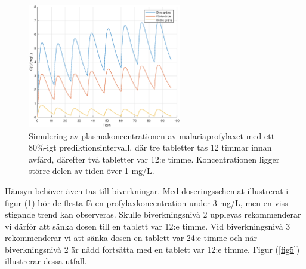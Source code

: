 \documentclass[a4paper,11pt]{article}
\begin{document}
\begin{figure}[H]
\centering
\includegraphics[width=0.6\textwidth]{fig4.eps}
\caption{\label{fig4}Simulering av plasmakoncentrationen av malariaprofylaxet med ett 80\%-igt prediktionsintervall, där tre tabletter tas 12 timmar innan avfärd, därefter två tabletter var 12:e timme. Koncentrationen ligger större delen av tiden över 1 mg/L.}
\end{figure}
Hänsyn behöver även tas till biverkningar. Med doseringsschemat illustrerat i figur (\ref{fig4}) bör de flesta få en profylaxkoncentration under 3 mg/L, men en viss stigande trend kan observeras. Skulle biverkningsnivå 2 upplevas rekommenderar vi därför att sänka dosen till en tablett var 12:e timme. Vid biverkningsnivå 3 rekommenderar vi att sänka dosen en tablett var 24:e timme och när biverkningsnivå 2 är nådd fortsätta med en tablett var 12:e timme. Figur (\ref{fig5}) illustrerar dessa utfall.
\end{document}
